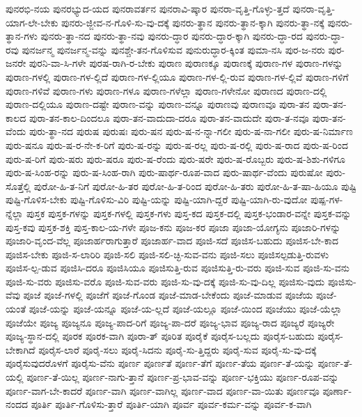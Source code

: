 {ಪುನರಭಿ-ನಯ
ಪುನರಭ್ಯುದ-ಯದ
ಪುನರಾವರ್ತನ
ಪುನರಾವಿ-ಷ್ಕಾರ
ಪುನರಾ-ವೃತ್ತಿ-ಗೊಳ್ಳು-ತ್ತದೆ
ಪುನರಾ-ವೃತ್ತಿ-ಯಾಗ-ಲೇ-ಬೇಕು
ಪುನರು-ಜ್ಜೀವ-ನ-ಗೊಳಿ-ಸು-ವು-ದಕ್ಕೆ
ಪುನರು-ತ್ಥಾನ
ಪುನರು-ತ್ಥಾನ-ಕ್ಕಾಗಿ
ಪುನರು-ತ್ಥಾ-ನಕ್ಕೆ
ಪುನರು-ತ್ಥಾನ-ಗಳು
ಪುನರು-ತ್ಥಾ-ನದ
ಪುನರು-ತ್ಥಾ-ನವು
ಪುನರು-ದ್ಧಾರ
ಪುನರು-ದ್ಧಾರ-ಕ್ಕಾಗಿ
ಪುನರು-ದ್ಧಾ-ರದ
ಪುನರು-ದ್ಧಾ-ರವು
ಪುನರ್ಜನ್ಮ
ಪುನರ್ಜನ್ಮ-ವನ್ನು
ಪುನಶ್ಚೇ-ತನ-ಗೊಳಿಸುವ
ಪುನುರುದ್ಧಾರ-ಕ್ಕಿಂತ
ಪುಮಾ-ನಸಿ
ಪುರ-ಜ-ನರು
ಪುರ-ಜನರೇ
ಪುರನಿ-ವಾ-ಸಿ-ಗಳೇ
ಪುರಷ-ರಾಗಿ-ರ-ಬೇಕು
ಪುರಾಣ
ಪುರಾಣಕ್ಕೂ
ಪುರಾಣಕ್ಕೆ
ಪುರಾಣ-ಗಳ
ಪುರಾಣ-ಗಳನ್ನು
ಪುರಾಣ-ಗಳಲ್ಲಿ
ಪುರಾಣ-ಗಳ-ಲ್ಲಿದೆ
ಪುರಾಣ-ಗಳ-ಲ್ಲಿಯೂ
ಪುರಾಣ-ಗಳ-ಲ್ಲಿ-ರುವ
ಪುರಾಣ-ಗಳ-ಲ್ಲಿವೆ
ಪುರಾಣ-ಗಳಿಗೆ
ಪುರಾಣ-ಗಳಿವೆ
ಪುರಾಣ-ಗಳು
ಪುರಾಣ-ಗಳೂ
ಪುರಾಣ-ಗಳೆಲ್ಲಾ
ಪುರಾಣ-ಗಳೇನೋ
ಪುರಾಣದ
ಪುರಾಣ-ದಲ್ಲಿ
ಪುರಾಣ-ದಲ್ಲಿಯೂ
ಪುರಾಣ-ದಷ್ಟೇ
ಪುರಾಣ-ವನ್ನು
ಪುರಾಣ-ವನ್ನೂ
ಪುರಾಣವು
ಪುರಾಣವೂ
ಪುರಾ-ತನ
ಪುರಾ-ತನ-ಕಾಲದ
ಪುರಾ-ತನ-ಕಾಲ-ದಿಂದಲೂ
ಪುರಾ-ತನ-ವಾದುದಾ-ದರೂ
ಪುರಾ-ತನ-ವಾದುದೇ
ಪುರಾ-ತ-ನವೂ
ಪುರಾ-ತನ-ವೆಂದು
ಪುರು-ತ್ಥಾ-ನದ
ಪುರುಷ
ಪುರುಷಃ
ಪುರು-ಷನ
ಪುರು-ಷ-ನ-ನ್ನಾ-ಗಲೀ
ಪುರು-ಷ-ನಾ-ಗಲೀ
ಪುರು-ಷ-ನಿರ್ಮಾಣ
ಪುರು-ಷನೂ
ಪುರು-ಷ-ರ-ನೇ-ಕ-ರಿಗೆ
ಪುರು-ಷ-ರನ್ನು
ಪುರು-ಷ-ರಲ್ಲ
ಪುರು-ಷ-ರಲ್ಲಿ
ಪುರು-ಷ-ರಾದ
ಪುರು-ಷ-ರಿಂದ
ಪುರು-ಷ-ರಿಗೆ
ಪುರು-ಷರು
ಪುರು-ಷರೂ
ಪುರು-ಷ-ರೆಂದು
ಪುರು-ಷರೇ
ಪುರು-ಷ-ರೊಬ್ಬರು
ಪುರು-ಷ-ಶಿಶು-ಗಳಿಗೂ
ಪುರು-ಷ-ಸಿಂಹ-ರನ್ನು
ಪುರು-ಷ-ಸಿಂಹ-ರಾಗಿ
ಪುರು-ಷಾರ್ಥ-ರೂಪ-ವಾದ
ಪುರು-ಷಾರ್ಥ-ವೆಂದು
ಪುರುಷೋ
ಪುರು-ಸೊತ್ತೆಲ್ಲಿ
ಪುರೋ-ಹಿ-ತ-ನಿಗೆ
ಪುರೋ-ಹಿ-ತರ
ಪುರೋ-ಹಿ-ತ-ರಿಂದ
ಪುರೋ-ಹಿ-ತರು
ಪುರೋ-ಹಿ-ತ-ಷಾ-ಹಿಯೂ
ಪುಷ್ಟಿ
ಪುಷ್ಟಿ-ಗೊಳಿಸ-ಬೇಕು
ಪುಷ್ಟಿ-ಗೊಳಿಸು-ವಿರಿ
ಪುಷ್ಟಿ-ಯನ್ನು
ಪುಷ್ಟಿ-ಯಾಗಿ-ದ್ದರೆ
ಪುಷ್ಟಿ-ಯಾಗಿ-ರು-ವುದೋ
ಪುಷ್ಪ-ಗಳ-ನ್ನೆಲ್ಲಾ
ಪುಸ್ತಕ
ಪುಸ್ತಕ-ಗಳನ್ನು
ಪುಸ್ತಕ-ಗಳಲ್ಲಿ
ಪುಸ್ತಕ-ಗಳು
ಪುಸ್ತ-ಕದ
ಪುಸ್ತಕ-ದಲ್ಲಿ
ಪುಸ್ತಕ-ಭಂಡಾರ-ವನ್ನೇ
ಪುಸ್ತಕ-ವನ್ನು
ಪುಸ್ತ-ಕವು
ಪುಸ್ತಕ-ಶಕ್ತಿ
ಪುಸ್ತ-ಕಾಲ-ಯ-ಗಳೇ
ಪೂಜ-ಕನು
ಪೂಜ-ಕರ
ಪೂಜಾ
ಪೂಜಾ-ಯೋಗ್ಯನು
ಪೂಜಾರಿ-ಗಳನ್ನು
ಪೂಜಾರಿ-ವೃಂದ-ವೆಲ್ಲ
ಪೂಜಾರ್ಹರಾಗುತ್ತಾರೆ
ಪೂಜಾರ್ಹ-ವಾದ
ಪೂಜಿ-ಸದೆ
ಪೂಜಿಸ-ಬಹುದು
ಪೂಜಿಸ-ಬೇ-ಕಾದ
ಪೂಜಿಸ-ಬೇಕು
ಪೂಜಿ-ಸ-ಲಾರಿರಿ
ಪೂಜಿ-ಸಲಿ
ಪೂಜಿ-ಸಲಿ-ಚ್ಛಿ-ಸುವ-ವನು
ಪೂಜಿ-ಸಲು
ಪೂಜಿಸಲ್ಪಡುತ್ತಿ-ರುವಳು
ಪೂಜಿಸ-ಲ್ಪ-ಡುವ
ಪೂಜಿಸಿ-ದರೂ
ಪೂಜಿಸಿಯೂ
ಪೂಜಿಸುತ್ತಿ-ರುವ
ಪೂಜಿಸುತ್ತಿ-ರು-ವರು
ಪೂಜಿ-ಸುವ
ಪೂಜಿ-ಸು-ವನು
ಪೂಜಿ-ಸು-ವರು
ಪೂಜಿಸು-ವರೊ
ಪೂಜಿ-ಸುವ-ವರು
ಪೂಜಿ-ಸು-ವು-ದಕ್ಕೆ
ಪೂಜಿ-ಸು-ವು-ದಿಲ್ಲ
ಪೂಜಿಸು-ವುದು
ಪೂಜಿಸು-ವೆವು
ಪೂಜೆ
ಪೂಜೆ-ಗಳಲ್ಲಿ
ಪೂಜೆಗೆ
ಪೂಜೆ-ಗೊಂಡ
ಪೂಜೆ-ಮಾಡ-ಬೇಕೆಂದು
ಪೂಜೆ-ಮಾಡುವ
ಪೂಜೆಯ
ಪೂಜೆ-ಯಂತೆ
ಪೂಜೆ-ಯನ್ನು
ಪೂಜೆ-ಯನ್ನೂ
ಪೂಜೆ-ಯ-ಲ್ಲದೆ
ಪೂಜೆ-ಯಲ್ಲೂ
ಪೂಜೆ-ಯಿಂದ
ಪೂಜೆಯು
ಪೂಜೆ-ಯೆಲ್ಲಾ
ಪೂಜೆಯೇ
ಪೂಜ್ಯ
ಪೂಜ್ಯನೂ
ಪೂಜ್ಯ-ಪಾದ-ರಿಗೆ
ಪೂಜ್ಯ-ಪಾ-ದರೆ
ಪೂಜ್ಯ-ಭಾವ
ಪೂಜ್ಯ-ರಾದ
ಪೂಜ್ಯರೆ
ಪೂಜ್ಯರೇ
ಪೂಜ್ಯ-ಸ್ಥಾನ-ದಲ್ಲಿ
ಪೂರಕ
ಪೂರಕ-ವಾಗಿ
ಪೂರಾ-ತ್
ಪೂರಿತ
ಪೂರೈಕೆ
ಪೂರೈಸ-ಬಲ್ಲದು
ಪೂರೈಸ-ಬಹುದು
ಪೂರೈಸ-ಬೇಕಾಗಿದೆ
ಪೂರೈಸ-ಲಾರೆ
ಪೂರೈ-ಸಲು
ಪೂರೈ-ಸಿದನು
ಪೂರೈ-ಸು-ತ್ತಿದ್ದರು
ಪೂರೈ-ಸುವ
ಪೂರೈ-ಸು-ವು-ದಕ್ಕೆ
ಪೂರೈಸುವುದರೊಳಗೆ
ಪೂರೈಸು-ವೆನು
ಪೂರ್ಣ
ಪೂರ್ಣತೆ
ಪೂರ್ಣ-ತೆಗೆ
ಪೂರ್ಣ-ತೆಯ
ಪೂರ್ಣ-ತೆ-ಯನ್ನು
ಪೂರ್ಣ-ತೆ-ಯಲ್ಲಿ
ಪೂರ್ಣ-ತೆ-ಯಿಲ್ಲ
ಪೂರ್ಣ-ನಾಗು-ತ್ತಾನೆ
ಪೂರ್ಣ-ಪ್ರ-ಭಾವ-ವನ್ನು
ಪೂರ್ಣ-ಭಕ್ತಿಯು
ಪೂರ್ಣ-ರೂಪ-ವನ್ನು
ಪೂರ್ಣ-ವಾಗ-ಬೇ-ಕಾದರೆ
ಪೂರ್ಣ-ವಾಗಿ
ಪೂರ್ಣ-ವಾಗಿಲ್ಲ
ಪೂರ್ಣ-ವಾದ
ಪೂರ್ಣ-ವಾ-ಯಿತು
ಪೂರ್ಣವೂ
ಪೂರ್ಣಾ-ನಂದದ
ಪೂರ್ತಿ
ಪೂರ್ತಿ-ಗೊಳಿಸು-ತ್ತಾರೆ
ಪೂರ್ತಿ-ಯಾಗಿ
ಪೂರ್ವ
ಪೂರ್ವ-ಕರ್ಮ-ವನ್ನು
ಪೂರ್ವ-ಕ-ವಾಗಿ
}
